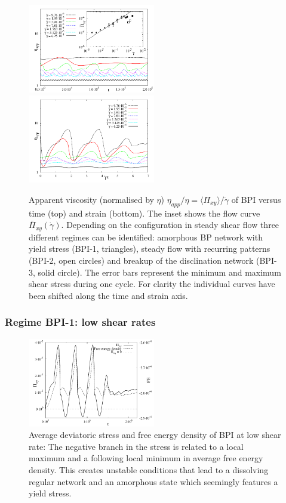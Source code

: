 \documentclass[aps,pre,reprint,superscriptaddress, twocolumn]{revtex4}
\newcommand{\gd}{\dot{\gamma}}
\begin{document}
\begin{figure}[htpb]
\includegraphics[width=0.495\textwidth]{stress_bp1.pdf}
\includegraphics[width=0.495\textwidth]{stress_vs_strain_bp1.pdf}
\caption{Apparent viscosity (normalised by $\eta$) $\eta_{app}/\eta=\langle \Pi_{xy}\rangle/\dot{\gamma}$ of BPI versus time (top) 
and strain (bottom). The inset shows the flow curve $\bar{\Pi}_{xy}(\gd)$. 
Depending on the configuration in steady shear flow three different regimes 
can be identified: amorphous BP network with yield stress (BPI-1, triangles), 
steady flow with recurring patterns (BPI-2, open circles) and 
breakup of the disclination network (BPI-3, solid circle). 
The error bars represent the minimum and maximum shear stress 
during one cycle. For clarity the individual curves have been shifted along
the time and strain axis.}
\label{bp1-rheo}
\end{figure}


\subsubsection{Regime BPI-1: low shear rates}

\begin{figure}[htpb]
\includegraphics[width=0.495\textwidth]{stress_fe_yield_bp1.pdf}
\caption{Average deviatoric stress and free energy density of BPI at low shear rate: 
The negative branch in the stress is related to a local maximum and a following local 
minimum in average free energy density. This creates unstable conditions that lead 
to a dissolving regular network and an amorphous state which 
seemingly features a yield stress.}
\label{bp1-fe-yield}
\end{figure}
\end{document}

